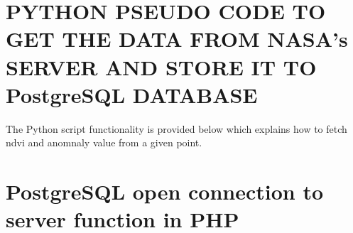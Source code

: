 \appendix
%
%

\chapter{PYTHON PSEUDO CODE TO GET THE DATA FROM NASA's SERVER AND STORE IT TO PostgreSQL DATABASE}\label{append:python_script_appendix}

The Python script functionality is provided below which explains how to fetch \gls{ndvi} and anomnaly value from a given point. 



\newpage

\chapter{PostgreSQL open connection to server function in PHP}\label{append:php_webservice}



\newpage



